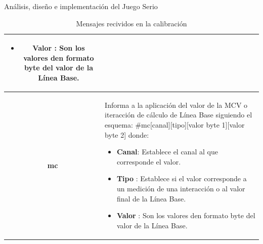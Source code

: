 \begin{thesischapter}{2} {Análisis, diseño e implementación del Juego Serio}
\begin{table}[ht]
\begin{tabular}{ |c|p{14cm}|}
\begin{minipage}{14cm}
\begin{itemize}
                                        \item \textbf{Valor} : Son los valores den formato byte del valor de la Línea Base.  
                                    \end{itemize}
                                    \vspace{1pt}
                                \end{minipage}\\\hline 
            \textbf{mc}     &   \begin{minipage}{14cm}
                                    \vspace{1pt}
                                    Informa a la aplicación del valor de la MCV o iteracción de cálculo de Línea Base siguiendo el esquema: \#mc[canal][tipo][valor byte 1][valor byte 2] donde:
                                    \begin{itemize}
                                        \item \textbf{Canal}: Establece el canal al que corresponde el valor.
                                        \item \textbf{Tipo} : Establece si el valor corresponde a un medición de una interacción o al valor final de la Línea Base.
                                        \item \textbf{Valor} : Son los valores den formato byte del valor de la Línea Base.  
                                    \end{itemize}
                                    \vspace{1pt}
                                \end{minipage} \\\hline                        
        \end{tabular}
        \label{table:recive-msg-in-calibration}
        \caption{Mensajes recividos en la calibración}
    \end{table} 



\end{thesischapter}
